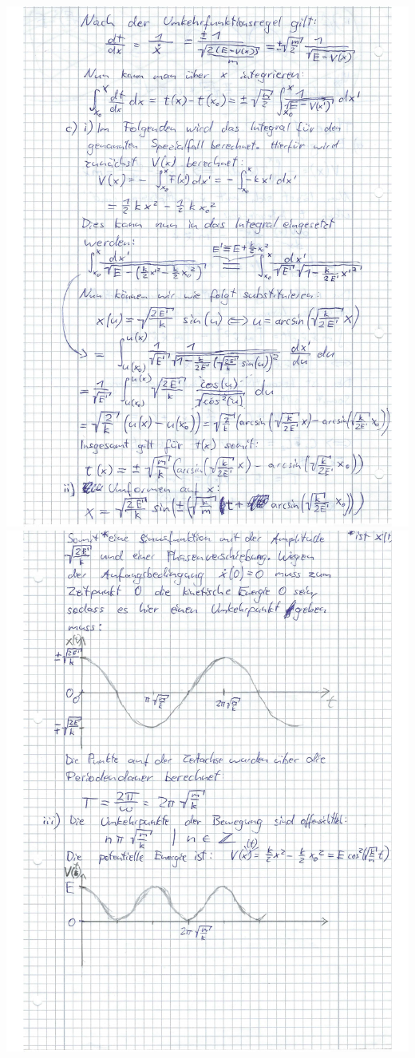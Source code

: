 \documentclass{theozettel}
\begin{document}
\begin{center}
\includegraphics[width=15cm]{A2-Teil2.pdf}\\
\includegraphics[width=15cm]{A2-Teil3.pdf}
\end{center}
\end{document}
